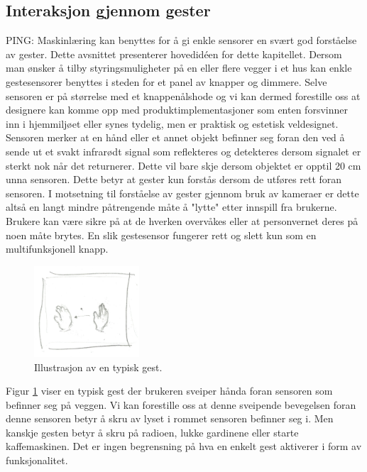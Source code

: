 \subsection{Interaksjon gjennom gester}
\label{ch:2.minide}
{\color{red}PING: Maskinlæring kan benyttes for å gi enkle sensorer en svært god forståelse av gester.}
Dette avsnittet presenterer hovedidéen for dette kapitellet. 
Dersom man ønsker å tilby styringsmuligheter på en eller flere vegger i et hus kan enkle gestesensorer benyttes i steden for et panel av knapper og dimmere. Selve sensoren er på størrelse med et knappenålshode og vi kan dermed forestille oss at designere kan komme opp med produktimplementasjoner som enten forsvinner inn i hjemmiljøet eller synes tydelig, men er praktisk og estetisk veldesignet. Sensoren merker at en hånd eller et annet objekt befinner seg foran den ved å sende ut et svakt infrarødt signal som reflekteres og detekteres dersom signalet er sterkt nok når det returnerer. Dette vil bare skje dersom objektet er opptil 20 cm unna sensoren. Dette betyr at gester kun forstås dersom de utføres rett foran sensoren. I motsetning til forståelse av gester gjennom bruk av kameraer er dette altså en langt mindre påtrengende måte å "lytte" etter innspill fra brukerne. Brukere kan være sikre på at de hverken overvåkes eller at personvernet deres på noen måte brytes. En slik gestesensor fungerer rett og slett kun som en multifunksjonell knapp.

\begin{figure}
    \vspace{-20pt}
  \begin{center}
    \includegraphics[width=0.35\textwidth]{fig/swipe-l-r}
  \end{center}
  \vspace{-20pt}
  \caption{Illustrasjon av en typisk gest.}
  \label{fig:gest}
  \vspace{-7pt}
\end{figure}

Figur \ref{fig:gest} viser en typisk gest der brukeren sveiper hånda foran sensoren som befinner seg på veggen. Vi kan forestille oss at denne sveipende bevegelsen foran denne sensoren betyr å skru av lyset i rommet sensoren befinner seg i. Men kanskje gesten betyr å skru på radioen, lukke gardinene eller starte kaffemaskinen. Det er ingen begrensning på hva en enkelt gest aktiverer i form av funksjonalitet.

